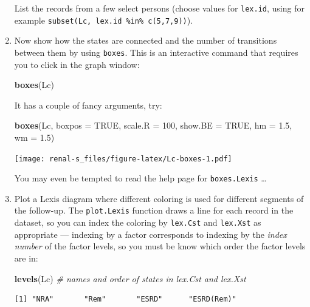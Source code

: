 \documentclass[
]{book}
\newenvironment{Shaded}{\begin{snugshade}}{\end{snugshade}}
\newcommand{\AttributeTok}[1]{\textcolor[rgb]{0.13,0.29,0.53}{#1}}
\newcommand{\CommentTok}[1]{\textcolor[rgb]{0.56,0.35,0.01}{\textit{#1}}}
\newcommand{\ConstantTok}[1]{\textcolor[rgb]{0.56,0.35,0.01}{#1}}
\newcommand{\DecValTok}[1]{\textcolor[rgb]{0.00,0.00,0.81}{#1}}
\newcommand{\FloatTok}[1]{\textcolor[rgb]{0.00,0.00,0.81}{#1}}
\newcommand{\FunctionTok}[1]{\textcolor[rgb]{0.13,0.29,0.53}{\textbf{#1}}}
\newcommand{\NormalTok}[1]{#1}
\begin{document}
\begin{enumerate}
  List the records from a few select persons (choose values for
  \texttt{lex.id}, using for example \texttt{subset(Lc,\ lex.id\ \%in\%\ c(5,7,9))}).
\item
  Now show how the states are connected and the number of transitions
  between them by using \texttt{boxes}. This is an interactive command
  that requires you to click in the graph window:

\begin{Shaded}
\begin{Highlighting}[]
\FunctionTok{boxes}\NormalTok{(Lc)}
\end{Highlighting}
\end{Shaded}

  It has a couple of fancy arguments, try:

\begin{Shaded}
\begin{Highlighting}[]
\FunctionTok{boxes}\NormalTok{(Lc, }\AttributeTok{boxpos =} \ConstantTok{TRUE}\NormalTok{, }\AttributeTok{scale.R =} \DecValTok{100}\NormalTok{, }\AttributeTok{show.BE =} \ConstantTok{TRUE}\NormalTok{, }\AttributeTok{hm =} \FloatTok{1.5}\NormalTok{, }\AttributeTok{wm =} \FloatTok{1.5}\NormalTok{)}
\end{Highlighting}
\end{Shaded}

  \texttt{[image: renal-s\_files/figure-latex/Lc-boxes-1.pdf]}

  You may even be tempted to read the help page for
  \texttt{boxes.Lexis} \ldots{}
\item
  Plot a Lexis diagram where different coloring is
  used for different segments of the follow-up. The
  \texttt{plot.Lexis} function draws a line for each record in the
  dataset, so you can index the coloring by \texttt{lex.Cst} and
  \texttt{lex.Xst} as appropriate --- indexing by a factor corresponds
  to indexing by the \emph{index number} of the factor levels, so you
  must be know which order the factor levels are in:

\begin{Shaded}
\begin{Highlighting}[]
\FunctionTok{levels}\NormalTok{(Lc) }\CommentTok{\# names and order of states in lex.Cst and lex.Xst}
\end{Highlighting}
\end{Shaded}

\begin{verbatim}
[1] "NRA"       "Rem"       "ESRD"      "ESRD(Rem)"
\end{verbatim}


\end{enumerate}
\end{document}
